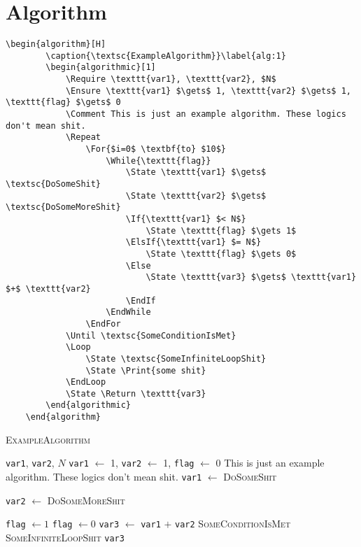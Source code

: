 \documentclass{article}
\begin{document}
	\newpage
	\section{Algorithm}\label{sec:algo}
	\begin{Verbatim}[tabsize=4]
	\begin{algorithm}[H]
		\caption{\textsc{ExampleAlgorithm}}\label{alg:1}
		\begin{algorithmic}[1]
			\Require \texttt{var1}, \texttt{var2}, $N$ 
			\Ensure \texttt{var1} $\gets$ 1, \texttt{var2} $\gets$ 1, \texttt{flag} $\gets$ 0
			\Comment This is just an example algorithm. These logics don't mean shit.
			\Repeat
				\For{$i=0$ \textbf{to} $10$}	
					\While{\texttt{flag}}
						\State \texttt{var1} $\gets$ \textsc{DoSomeShit}
						\State \texttt{var2} $\gets$ \textsc{DoSomeMoreShit}
						\If{\texttt{var1} $< N$}
							\State \texttt{flag} $\gets 1$
						\ElsIf{\texttt{var1} $= N$}
							\State \texttt{flag} $\gets 0$
						\Else
							\State \texttt{var3} $\gets$ \texttt{var1} $+$ \texttt{var2}
						\EndIf
					\EndWhile
				\EndFor
			\Until \textsc{SomeConditionIsMet}
			\Loop
				\State \textsc{SomeInfiniteLoopShit}
				\State \Print{some shit}
			\EndLoop
			\State \Return \texttt{var3}
		\end{algorithmic}
	\end{algorithm}
	\end{Verbatim}
	\begin{algorithm}[H]
		\caption{\textsc{ExampleAlgorithm}}\label{alg:1}
		\begin{algorithmic}[1]
			\Require \texttt{var1}, \texttt{var2}, $N$ 
			\Ensure \texttt{var1} $\gets$ 1, \texttt{var2} $\gets$ 1, \texttt{flag} $\gets$ 0
			\Comment This is just an example algorithm. These logics don't mean shit.
			\Repeat
					\State \texttt{var1} $\gets$ \textsc{DoSomeShit}
					
					\State \texttt{var2} $\gets$ \textsc{DoSomeMoreShit}
					
						\State \texttt{flag} $\gets 1$
						\State \texttt{flag} $\gets 0$
					\Else
						\State \texttt{var3} $\gets$ \texttt{var1} $+$ \texttt{var2}
					\EndIf
				\EndWhile
			\EndFor
			\Until \textsc{SomeConditionIsMet}
			\Loop
				\State \textsc{SomeInfiniteLoopShit}
				\State {}
			\EndLoop
			\State \Return \texttt{var3}
		\end{algorithmic}
	\end{algorithm}
	
\end{document}
